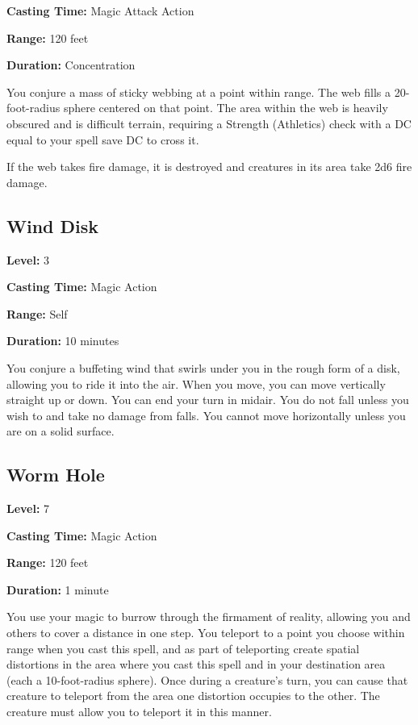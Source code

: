 \documentclass[12pt,letterpaper,twocolumn,openany,nodeprecatedcode,bg=none]{dndbook}
\begin{document}
\textbf{Casting Time:} Magic Attack Action

\textbf{Range:} 120 feet

\textbf{Duration:} Concentration

You conjure a mass of sticky webbing at a point within range. The web
fills a 20-foot-radius sphere centered on that point. The area within
the web is heavily obscured and is difficult terrain, requiring a
Strength (Athletics) check with a DC equal to your spell save DC to
cross it.

If the web takes fire damage, it is destroyed and creatures in its area
take 2d6 fire damage.

\subsection{Wind Disk}\label{wind-disk}

\textbf{Level:} 3

\textbf{Casting Time:} Magic Action

\textbf{Range:} Self

\textbf{Duration:} 10 minutes

You conjure a buffeting wind that swirls under you in the rough form of
a disk, allowing you to ride it into the air. When you move, you can
move vertically straight up or down. You can end your turn in midair.
You do not fall unless you wish to and take no damage from falls. You
cannot move horizontally unless you are on a solid surface.

\subsection{Worm Hole}\label{worm-hole}

\textbf{Level:} 7

\textbf{Casting Time:} Magic Action

\textbf{Range:} 120 feet

\textbf{Duration:} 1 minute

You use your magic to burrow through the firmament of reality, allowing
you and others to cover a distance in one step. You teleport to a point
you choose within range when you cast this spell, and as part of
teleporting create spatial distortions in the area where you cast this
spell and in your destination area (each a 10-foot-radius sphere). Once
during a creature's turn, you can cause that creature to teleport from
the area one distortion occupies to the other. The creature must allow
you to teleport it in this manner.
\end{document}
